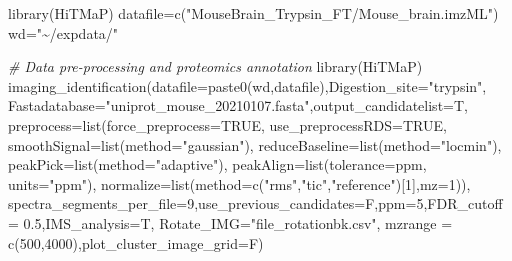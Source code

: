 \documentclass[
]{article}
\newenvironment{Shaded}{\begin{snugshade}}{\end{snugshade}}
\newcommand{\AttributeTok}[1]{\textcolor[rgb]{0.77,0.63,0.00}{#1}}
\newcommand{\CommentTok}[1]{\textcolor[rgb]{0.56,0.35,0.01}{\textit{#1}}}
\newcommand{\ConstantTok}[1]{\textcolor[rgb]{0.00,0.00,0.00}{#1}}
\newcommand{\DecValTok}[1]{\textcolor[rgb]{0.00,0.00,0.81}{#1}}
\newcommand{\FloatTok}[1]{\textcolor[rgb]{0.00,0.00,0.81}{#1}}
\newcommand{\FunctionTok}[1]{\textcolor[rgb]{0.00,0.00,0.00}{#1}}
\newcommand{\NormalTok}[1]{#1}
\newcommand{\OtherTok}[1]{\textcolor[rgb]{0.56,0.35,0.01}{#1}}
\newcommand{\StringTok}[1]{\textcolor[rgb]{0.31,0.60,0.02}{#1}}
\begin{document}
\begin{Shaded}
\begin{Highlighting}[]
\FunctionTok{library}\NormalTok{(HiTMaP)}
\NormalTok{datafile}\OtherTok{=}\FunctionTok{c}\NormalTok{(}\StringTok{"MouseBrain\_Trypsin\_FT/Mouse\_brain.imzML"}\NormalTok{)}
\NormalTok{wd}\OtherTok{=}\StringTok{"\textasciitilde{}/expdata/"}

\CommentTok{\# Data pre{-}processing and proteomics annotation}
\FunctionTok{library}\NormalTok{(HiTMaP)}
\FunctionTok{imaging\_identification}\NormalTok{(}\AttributeTok{datafile=}\FunctionTok{paste0}\NormalTok{(wd,datafile),}\AttributeTok{Digestion\_site=}\StringTok{"trypsin"}\NormalTok{,}
                       \AttributeTok{Fastadatabase=}\StringTok{"uniprot\_mouse\_20210107.fasta"}\NormalTok{,}\AttributeTok{output\_candidatelist=}\NormalTok{T,}
                       \AttributeTok{preprocess=}\FunctionTok{list}\NormalTok{(}\AttributeTok{force\_preprocess=}\ConstantTok{TRUE}\NormalTok{,}
                               \AttributeTok{use\_preprocessRDS=}\ConstantTok{TRUE}\NormalTok{,}
                               \AttributeTok{smoothSignal=}\FunctionTok{list}\NormalTok{(}\AttributeTok{method=}\StringTok{"gaussian"}\NormalTok{),}
                               \AttributeTok{reduceBaseline=}\FunctionTok{list}\NormalTok{(}\AttributeTok{method=}\StringTok{"locmin"}\NormalTok{),}
                               \AttributeTok{peakPick=}\FunctionTok{list}\NormalTok{(}\AttributeTok{method=}\StringTok{"adaptive"}\NormalTok{),}
                               \AttributeTok{peakAlign=}\FunctionTok{list}\NormalTok{(}\AttributeTok{tolerance=}\NormalTok{ppm, }\AttributeTok{units=}\StringTok{"ppm"}\NormalTok{),}
                               \AttributeTok{normalize=}\FunctionTok{list}\NormalTok{(}\AttributeTok{method=}\FunctionTok{c}\NormalTok{(}\StringTok{"rms"}\NormalTok{,}\StringTok{"tic"}\NormalTok{,}\StringTok{"reference"}\NormalTok{)[}\DecValTok{1}\NormalTok{],}\AttributeTok{mz=}\DecValTok{1}\NormalTok{)),}
                       \AttributeTok{spectra\_segments\_per\_file=}\DecValTok{9}\NormalTok{,}\AttributeTok{use\_previous\_candidates=}\NormalTok{F,}\AttributeTok{ppm=}\DecValTok{5}\NormalTok{,}\AttributeTok{FDR\_cutoff =} \FloatTok{0.5}\NormalTok{,}\AttributeTok{IMS\_analysis=}\NormalTok{T,}
                       \AttributeTok{Rotate\_IMG=}\StringTok{"file\_rotationbk.csv"}\NormalTok{,}
                       \AttributeTok{mzrange =} \FunctionTok{c}\NormalTok{(}\DecValTok{500}\NormalTok{,}\DecValTok{4000}\NormalTok{),}\AttributeTok{plot\_cluster\_image\_grid=}\NormalTok{F)}


\end{Highlighting}
\end{Shaded}
\end{document}
